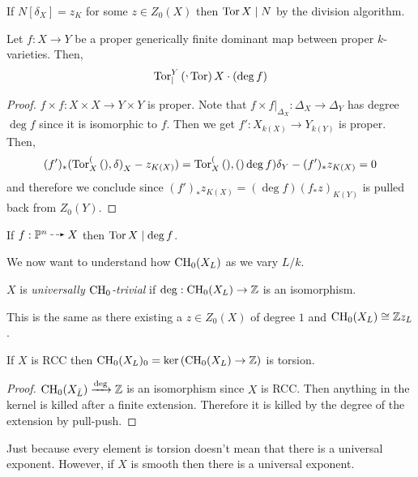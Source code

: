 \documentclass[12pt]{article}
\DeclareMathOperator{\torsion}{\mathrm{Tor}}
\begin{document}
\begin{rmk}
If $N [\delta_X] = z_K$ for some $z \in Z_0(X)$ then $\torsion{X} \divides N$ by the division algorithm. 
\end{rmk}

\begin{prop}
Let $f : X \to Y$ be a proper generically finite dominant map between proper $k$-varieties. Then,
\[ \Tor{Y} \divides \torsion{X} \cdot (\deg{f}) \] 
\end{prop}

\begin{proof}
$f \times f : X \times X \to Y \times Y$ is proper. Note that $f \times f |_{\Delta_X} : \Delta_X \to \Delta_Y$ has degree $\deg{f}$ since it is isomorphic to $f$. Then we get $f' : X_{k(X)} \to Y_{k(Y)}$ is proper. Then,
\[ (f')_* (\mathrm{Tor}^{(}_{X} \left( ), \delta \right)_X - z_{K(X)}) = \mathrm{Tor}^{(}_{X} \left( ), ( \right)\deg{f}) \delta_Y - (f')_* z_{K(X)} = 0 \]
and therefore we conclude since $(f')_* z_{K(X)} = (\deg{f}) (f_* z)_{K(Y)}$ is pulled back from $Z_0(Y)$. 
\end{proof}

\begin{cor}
If $f : \P^n \rat X$ then $\torsion{X} \divides \deg{f}$. 
\end{cor}

We now want to understand how $\mathrm{CH}_0(X_L)$ as we vary $L/k$.

\begin{defn}
$X$ is \textit{universally $\mathrm{CH}_0$-trivial} if $\deg : \mathrm{CH}_0(X_L) \to \mathbb{Z}$ is an isomorphism. 
\end{defn}

\begin{rmk}
This is the same as there existing a $z \in Z_0(X)$ of degree $1$ and $\mathrm{CH}_0(X_L) \cong \mathbb{Z} z_L$.
\end{rmk}

\begin{lemma}
If $X$ is RCC then $\mathrm{CH}_0(X_L)_0 = \ker{(\mathrm{CH}_0(X_L) \to \mathbb{Z})}$ is torsion. 
\end{lemma}

\begin{proof}
$\mathrm{CH}_0(X_{\bar{L}}) \xrightarrow{\deg} \mathbb{Z}$ is an isomorphism since $X$ is RCC. Then anything in the kernel is killed after a finite extension. Therefore it is killed by the degree of the extension by pull-push. 
\end{proof}

\begin{rmk}
Just because every element is torsion doesn't mean that there is a universal exponent. However, if $X$ is smooth then there is a universal exponent.
\end{rmk}
\end{document}
